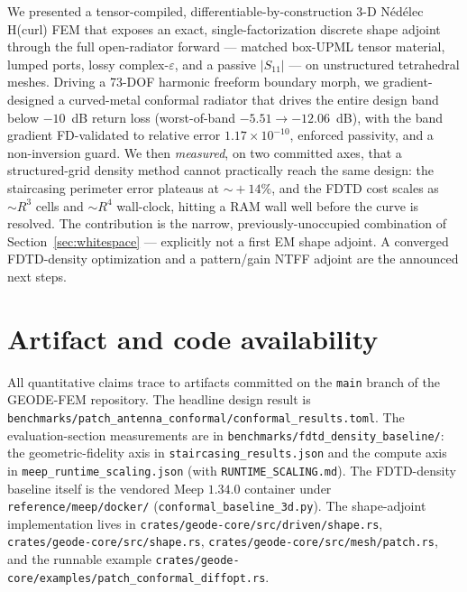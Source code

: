 \documentclass{anvil-paper}
\begin{document}
We presented a tensor-compiled, differentiable-by-construction 3-D N\'ed\'elec
H(curl) FEM that exposes an exact, single-factorization discrete shape adjoint
through the full open-radiator forward --- matched box-UPML tensor material,
lumped ports, lossy complex-$\varepsilon$, and a passive $|S_{11}|$ --- on
unstructured tetrahedral meshes. Driving a 73-DOF harmonic freeform boundary
morph, we gradient-designed a curved-metal conformal radiator that drives the
entire design band below $-10$~dB return loss (worst-of-band $-5.51 \to
-12.06$~dB), with the band gradient FD-validated to relative error
$1.17\times10^{-10}$, enforced passivity, and a non-inversion guard. We then
\emph{measured}, on two committed axes, that a structured-grid density method
cannot practically reach the same design: the staircasing perimeter error
plateaus at $\sim\!+14\%$, and the FDTD cost scales as $\sim\!R^3$ cells and
$\sim\!R^4$ wall-clock, hitting a RAM wall well before the curve is resolved.
The contribution is the narrow, previously-unoccupied combination of
Section~\ref{sec:whitespace} --- explicitly not a first EM shape adjoint. A
converged FDTD-density optimization and a pattern/gain NTFF adjoint are the
announced next steps.

\section*{Artifact and code availability}
\label{sec:availability}
All quantitative claims trace to artifacts committed on the \texttt{main} branch
of the GEODE-FEM repository. The headline design result is
\texttt{benchmarks/patch\_antenna\_conformal/conformal\_results.toml}. The
evaluation-section measurements are in \texttt{benchmarks/fdtd\_density\_baseline/}:
the geometric-fidelity axis in \texttt{staircasing\_results.json} and the compute
axis in \texttt{meep\_runtime\_scaling.json} (with \texttt{RUNTIME\_SCALING.md}).
The FDTD-density baseline itself is the vendored Meep $1.34.0$ container under
\texttt{reference/meep/docker/} (\texttt{conformal\_baseline\_3d.py}). The
shape-adjoint implementation lives in
\texttt{crates/geode-core/src/driven/shape.rs},
\texttt{crates/geode-core/src/shape.rs},
\texttt{crates/geode-core/src/mesh/patch.rs}, and the runnable example
\texttt{crates/geode-core/examples/patch\_conformal\_diffopt.rs}.



\end{document}

